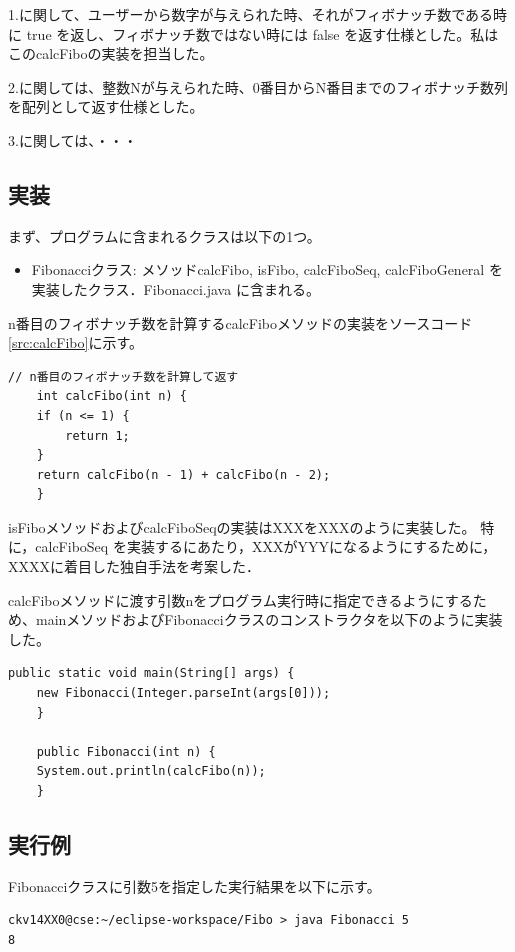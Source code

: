 \documentclass[a4j]{ujarticle}
\begin{document}
1.に関して、ユーザーから数字が与えられた時、それがフィボナッチ数である時に true を返し、フィボナッチ数ではない時には false を返す仕様とした。私はこのcalcFiboの実装を担当した。

2.に関しては、整数Nが与えられた時、0番目からN番目までのフィボナッチ数列を配列として返す仕様とした。

3.に関しては、・・・
\subsection{実装}

まず、プログラムに含まれるクラスは以下の1つ。
\begin{itemize}
\item Fibonacciクラス: メソッドcalcFibo, isFibo, calcFiboSeq, calcFiboGeneral を実装したクラス．Fibonacci.java に含まれる。
\end{itemize}

n番目のフィボナッチ数を計算するcalcFiboメソッドの実装をソースコード\ref{src:calcFibo}に示す。

\begin{lstlisting}[caption=calcFiboメソッド,label=src:calcFibo]
    // n番目のフィボナッチ数を計算して返す
    int calcFibo(int n) {
	if (n <= 1) {
	    return 1;
	}
	return calcFibo(n - 1) + calcFibo(n - 2);
    }
\end{lstlisting}

isFiboメソッドおよびcalcFiboSeqの実装はXXXをXXXのように実装した。
特に，calcFiboSeq を実装するにあたり，XXXがYYYになるようにするために，XXXXに着目した独自手法を考案した．

calcFiboメソッドに渡す引数nをプログラム実行時に指定できるようにするため、mainメソッドおよびFibonacciクラスのコンストラクタを以下のように実装した。
\begin{lstlisting}[caption=mainメソッドとコンストラクタ,label=src:main]
    public static void main(String[] args) {
	new Fibonacci(Integer.parseInt(args[0]));
    }

    public Fibonacci(int n) {
	System.out.println(calcFibo(n));
    }
\end{lstlisting}

\subsection{実行例}
Fibonacciクラスに引数5を指定した実行結果を以下に示す。

\begin{lstlisting}
ckv14XX0@cse:~/eclipse-workspace/Fibo > java Fibonacci 5
8
\end{lstlisting}
\end{document}
